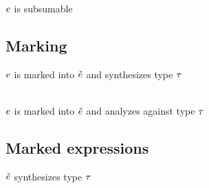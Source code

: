 \documentclass[formalism.tex]{subfiles}
\begin{document}
\judgbox{\subsumable{\EMV}} $\EMV$ is subsumable
%
\begin{mathpar}
\end{mathpar}

\subsection{Marking}
\label{sec:patterned-marking}
\judgbox{\ctxSynFixedInto{\ctx}{\EMV}{\ECMV}{\TMV}} $\EMV$ is marked into $\ECMV$ and synthesizes type $\TMV$
%
\begin{mathpar}
\end{mathpar} \\

\judgbox{\ctxAnaFixedInto{\ctx}{\EMV}{\ECMV}{\TMV}} $\EMV$ is marked into $\ECMV$ and analyzes against type $\TMV$
%
\begin{mathpar}
\end{mathpar}

\subsection{Marked expressions}
\label{sec:patterned-marked-expressions}
\judgbox{\ctxSynTypeM{\ctx}{\ECMV}{\TMV}} $\ECMV$ synthesizes type $\TMV$
%
\begin{mathpar}
\end{mathpar}
\end{document}
